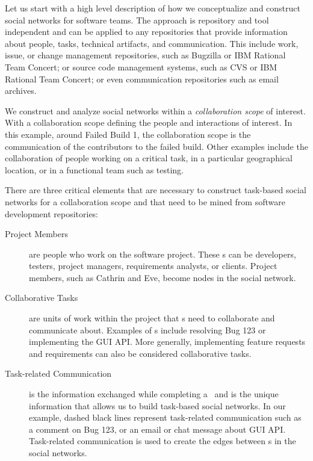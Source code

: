 Let us start with a high level description of how we conceptualize and construct social networks for software teams. 
The approach is repository and tool independent and can be applied to any repositories that provide information about people, tasks, technical artifacts, and communication. 
This include work, issue, or change management repositories, such as Bugzilla or IBM Rational Team Concert; or source code management systems, such as CVS or IBM Rational Team Concert; or even communication repositories such as email archives.

We construct and analyze social networks within a \emph{collaboration scope} of interest.
With a collaboration scope defining the people and interactions of interest.
In this example, around Failed Build 1, the collaboration scope is the communication of the contributors to the failed build. 
Other examples include the collaboration of people working on a critical task, in a particular geographical location, or in a functional team such as testing.

There are three critical elements that are necessary to construct task-based social networks for a collaboration scope and that need to be mined from software development repositories:

\begin{description}
\item[Project Members] are people who work on the software project. 
These \people s can be developers, testers, project managers, requirements analysts,
or clients. 
Project members, such as Cathrin and Eve, become nodes in the social network.

\item[Collaborative Tasks] are units of work within the project that \people s need to collaborate and communicate about. 
Examples of \cu s include resolving Bug  123 or implementing the GUI API. 
More generally, implementing feature requests and requirements can also be considered collaborative tasks.

\item[Task-related Communication] is the information exchanged while completing a \cu\ and is the unique information that allows us to build task-based social networks. 
In our example, dashed black lines represent task-related communication such as a comment on Bug 123, or an email or chat message about GUI API.
Task-related communication is used to create the edges between \people s in the social networks.
\end{description}

